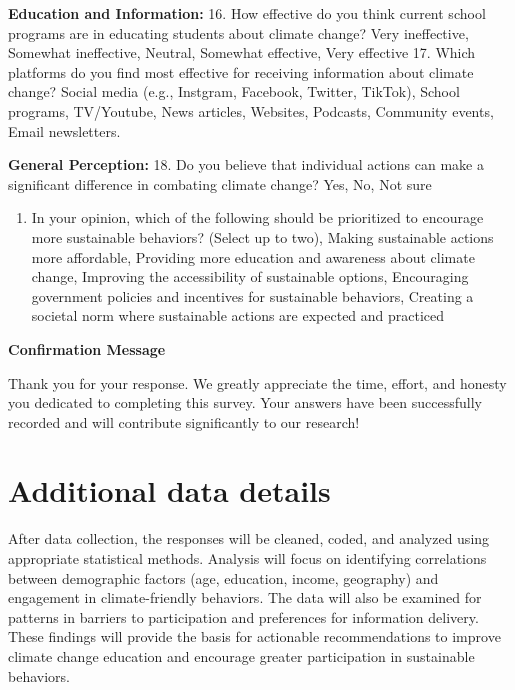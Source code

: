 \documentclass[
  letterpaper,
  DIV=11,
  numbers=noendperiod]{scrartcl}
\providecommand{\tightlist}{%
  \setlength{\itemsep}{0pt}\setlength{\parskip}{0pt}}\usepackage{longtable,booktabs,array}
\begin{document}
\textbf{Education and Information: } 16. How effective do you think
current school programs are in educating students about climate change?
Very ineffective, Somewhat ineffective, Neutral, Somewhat effective,
Very effective 17. Which platforms do you find most effective for
receiving information about climate change? Social media (e.g.,
Instgram, Facebook, Twitter, TikTok), School programs, TV/Youtube, News
articles, Websites, Podcasts, Community events, Email newsletters.

\textbf{General Perception: } 18. Do you believe that individual actions
can make a significant difference in combating climate change? Yes, No,
Not sure

\begin{enumerate}
\def\labelenumi{\arabic{enumi}.}
\setcounter{enumi}{18}
\tightlist
\item
  In your opinion, which of the following should be prioritized to
  encourage more sustainable behaviors? (Select up to two), Making
  sustainable actions more affordable, Providing more education and
  awareness about climate change, Improving the accessibility of
  sustainable options, Encouraging government policies and incentives
  for sustainable behaviors, Creating a societal norm where sustainable
  actions are expected and practiced
\end{enumerate}

\textbf{Confirmation Message}

Thank you for your response. We greatly appreciate the time, effort, and
honesty you dedicated to completing this survey. Your answers have been
successfully recorded and will contribute significantly to our research!

\section{Additional data details}\label{additional-data-details}

After data collection, the responses will be cleaned, coded, and
analyzed using appropriate statistical methods. Analysis will focus on
identifying correlations between demographic factors (age, education,
income, geography) and engagement in climate-friendly behaviors. The
data will also be examined for patterns in barriers to participation and
preferences for information delivery. These findings will provide the
basis for actionable recommendations to improve climate change education
and encourage greater participation in sustainable behaviors.
\end{document}
